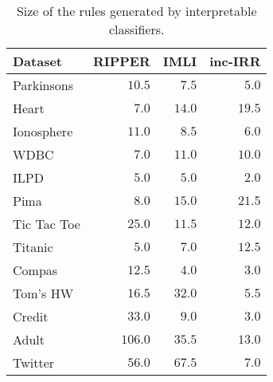 \documentclass{article}
\begin{document}
	\begin{table*}[h]		
		\begin{center}
			\begin{tabular}{|l |  r |r |r | }
				\hline
				{Dataset}  & RIPPER  &  {IMLI}  &  inc-{IRR}\\\hline		
				\multirow{1}{*}{ Parkinsons}   & $   10.5  $    & $   7.5  $    & $   5.0  $   \\ \hline
				\multirow{1}{*}{ Heart}   & $   7.0  $    & $   14.0  $    & $   19.5  $   \\ \hline
				\multirow{1}{*}{ Ionosphere}   & $   11.0  $    & $   8.5  $    & $   6.0  $   \\ \hline
				\multirow{1}{*}{ WDBC}   & $   7.0  $    & $   11.0  $    & $   10.0  $   \\ \hline
				\multirow{1}{*}{ ILPD}   & $   5.0  $    & $   5.0  $    & $   2.0  $   \\ \hline
				\multirow{1}{*}{ Pima}   & $   8.0  $    & $   15.0  $    & $   21.5  $   \\ \hline
				\multirow{1}{*}{ Tic Tac Toe}   & $   25.0  $    & $   11.5  $    & $   12.0  $   \\ \hline
				\multirow{1}{*}{ Titanic}   & $   5.0  $    & $   7.0  $    & $   12.5  $   \\ \hline
				\multirow{1}{*}{ Compas}   & $   12.5  $    & $   4.0  $    & $   3.0  $   \\ \hline
				\multirow{1}{*}{ Tom's HW}   & $   16.5  $    & $   32.0  $    & $   5.5  $   \\ \hline
				\multirow{1}{*}{ Credit}   & $   33.0  $    & $   9.0  $    & $   3.0  $   \\ \hline
				\multirow{1}{*}{ Adult}   & $   106.0  $    & $   35.5  $    & $   13.0  $   \\ \hline
				\multirow{1}{*}{ Twitter}   & $   56.0  $    & $   67.5  $    & $   7.0  $   \\ \hline
			\end{tabular}
		\end{center}
		\caption{Size of the rules generated by  interpretable classifiers.}	
	\end{table*}
\end{document}
